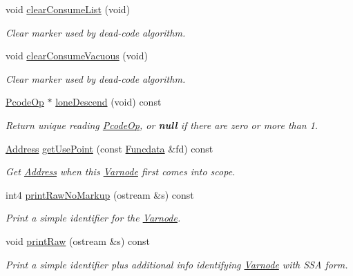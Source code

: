 \begin{DoxyCompactItemize}
void \mbox{\hyperlink{class_varnode_a0af9c863ba496cd2f4edd87cfca16681}{clear\+Consume\+List}} (void)
\begin{DoxyCompactList}\small\item\em Clear marker used by dead-\/code algorithm. \end{DoxyCompactList}\item 
void \mbox{\hyperlink{class_varnode_a71bc569e459e904cd199c89340a212e0}{clear\+Consume\+Vacuous}} (void)
\begin{DoxyCompactList}\small\item\em Clear marker used by dead-\/code algorithm. \end{DoxyCompactList}\item 
\mbox{\hyperlink{class_pcode_op}{Pcode\+Op}} $\ast$ \mbox{\hyperlink{class_varnode_a1899f1f493fed54c6dea1f445f146de6}{lone\+Descend}} (void) const
\begin{DoxyCompactList}\small\item\em Return unique reading \mbox{\hyperlink{class_pcode_op}{Pcode\+Op}}, or {\bfseries{null}} if there are zero or more than 1. \end{DoxyCompactList}\item 
\mbox{\hyperlink{class_address}{Address}} \mbox{\hyperlink{class_varnode_a9eab83050278fb3bd44d6179154e38de}{get\+Use\+Point}} (const \mbox{\hyperlink{class_funcdata}{Funcdata}} \&fd) const
\begin{DoxyCompactList}\small\item\em Get \mbox{\hyperlink{class_address}{Address}} when this \mbox{\hyperlink{class_varnode}{Varnode}} first comes into scope. \end{DoxyCompactList}\item 
int4 \mbox{\hyperlink{class_varnode_aa90c838f1e0116747e09e3d1fe72b18e}{print\+Raw\+No\+Markup}} (ostream \&s) const
\begin{DoxyCompactList}\small\item\em Print a simple identifier for the \mbox{\hyperlink{class_varnode}{Varnode}}. \end{DoxyCompactList}\item 
void \mbox{\hyperlink{class_varnode_aa4c614218fd461a8c5de1e27880f56fe}{print\+Raw}} (ostream \&s) const
\begin{DoxyCompactList}\small\item\em Print a simple identifier plus additional info identifying \mbox{\hyperlink{class_varnode}{Varnode}} with S\+SA form. \end{DoxyCompactList}\item 

\end{DoxyCompactItemize}
